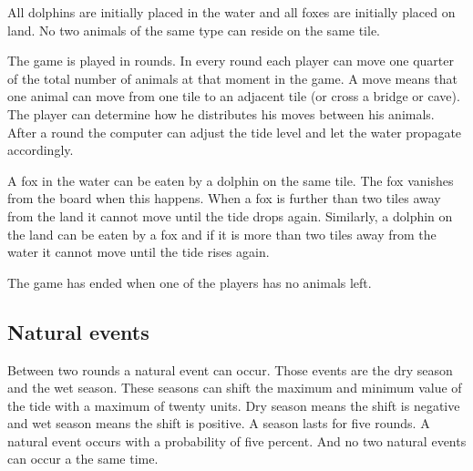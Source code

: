 \documentclass[12pt]{article}
\begin{document}
All dolphins are initially placed in the water and all foxes are initially placed on land. No two animals of the same type can reside on the same tile.

The game is played in rounds. In every round each player can move one quarter of the total number of animals at that moment in the game. A move means that one animal can move from one tile to an adjacent tile (or cross a bridge or cave). The player can determine how he distributes his moves between his animals. After a round the computer can adjust the tide level and let the water propagate accordingly.

A fox in the water can be eaten by a dolphin on the same tile. The fox vanishes from the board when this happens. When a fox is further than two tiles away from the land it cannot move until the tide drops again. Similarly, a dolphin on the land can be eaten by a fox and if it is more than two tiles away from the water it cannot move until the tide rises again.

The game has ended when one of the players has no animals left.

\subsection{Natural events}
Between two rounds a natural event can occur. Those events are the dry season and the wet season. These seasons can shift the maximum and minimum value of the tide with a maximum of twenty units. Dry season means the shift is negative and wet season means the shift is positive. A season lasts for five rounds. A natural event occurs with a probability of five percent. And no two natural events can occur a the same time.
\end{document}

